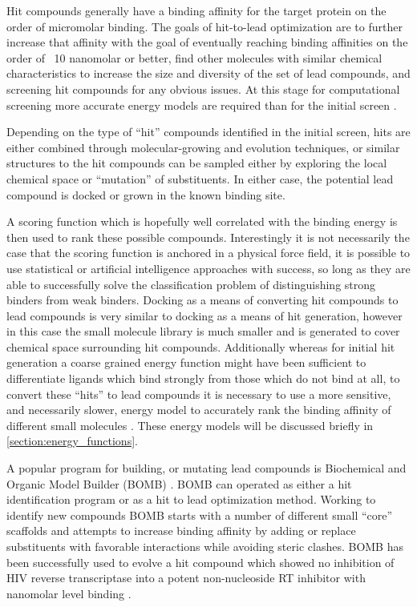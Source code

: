 Hit compounds generally have a binding affinity for the target protein on the order of micromolar binding.
The goals of hit-to-lead optimization are to further increase that affinity with the goal of eventually reaching binding affinities on the order of ~10 nanomolar or better, find other molecules with similar chemical characteristics to increase the size and diversity of the set of lead compounds, and screening hit compounds for any obvious issues.
At this stage for computational screening more accurate energy models are required than for the initial screen \cite{jorgensen2004many,gohlke2002approaches,jorgensen2009efficient}.

Depending on the type of ``hit'' compounds identified in the initial screen, hits are either combined through molecular-growing and evolution techniques, or similar structures to the hit compounds can be sampled either by exploring the local chemical space or ``mutation'' of substituents.
In either case, the potential lead compound is docked or grown in the known binding site.

A scoring function which is hopefully well correlated with the binding energy is then used to rank these possible compounds.
Interestingly it is not necessarily the case that the scoring function is anchored in a physical force field, it is possible to use statistical or artificial intelligence approaches with success, so long as they are able to successfully solve the classification problem of distinguishing strong binders from weak binders.
Docking as a means of converting hit compounds to lead compounds is very similar to docking as a means of hit generation, however in this case the small molecule library is much smaller and is generated to cover chemical space surrounding hit compounds.
Additionally whereas for initial hit generation a coarse grained energy function might have been sufficient to differentiate ligands which bind strongly from those which do not bind at all, to convert these ``hits'' to lead compounds it is necessary to use a more sensitive, and necessarily slower, energy model to accurately rank the binding affinity of different small molecules \cite{jorgensen2004many,gohlke2002approaches}.
These energy models will be discussed briefly in \ref{section:energy_functions}.

A popular program for building, or mutating lead compounds is Biochemical and Organic Model Builder (BOMB) \cite{barreiro2007docking}.
BOMB can operated as either a hit identification program or as a hit to lead optimization method.
Working to identify new compounds BOMB starts with a number of different small ``core'' scaffolds and attempts to increase binding affinity by adding or replace substituents with favorable interactions while avoiding steric clashes.
BOMB has been successfully used to evolve a hit compound which showed no inhibition of HIV reverse transcriptase into a potent non-nucleoside RT inhibitor with nanomolar level binding \cite{barreiro2007docking}.

